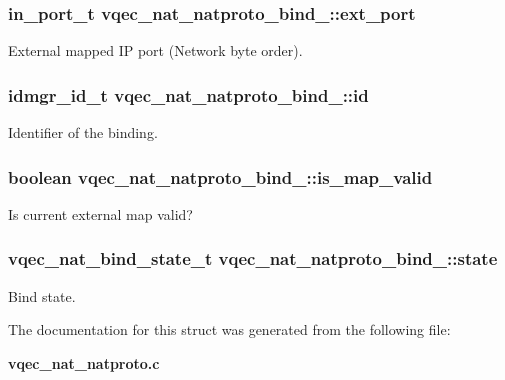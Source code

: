 \subsubsection{\setlength{\rightskip}{0pt plus 5cm}in\_\-port\_\-t \bf{vqec\_\-nat\_\-natproto\_\-bind\_\-::ext\_\-port}}\label{structvqec__nat__natproto__bind___94157759e1dbcd758c7ecc1ec6fb53ba}


External mapped IP port (Network byte order). 
\subsubsection{\setlength{\rightskip}{0pt plus 5cm}idmgr\_\-id\_\-t \bf{vqec\_\-nat\_\-natproto\_\-bind\_\-::id}}\label{structvqec__nat__natproto__bind___12886dafb2495cd0a2fb9f7a7cae57f4}


Identifier of the binding. 
\subsubsection{\setlength{\rightskip}{0pt plus 5cm}boolean \bf{vqec\_\-nat\_\-natproto\_\-bind\_\-::is\_\-map\_\-valid}}\label{structvqec__nat__natproto__bind___b6a96ca0addf74809ffd7d6540a84079}


Is current external map valid? 
\subsubsection{\setlength{\rightskip}{0pt plus 5cm}vqec\_\-nat\_\-bind\_\-state\_\-t \bf{vqec\_\-nat\_\-natproto\_\-bind\_\-::state}}\label{structvqec__nat__natproto__bind___f721aacab527e6df44e2312ae94b81f2}


Bind state. 

The documentation for this struct was generated from the following file:\begin{CompactItemize}
\item 
\bf{vqec\_\-nat\_\-natproto.c}\end{CompactItemize}

